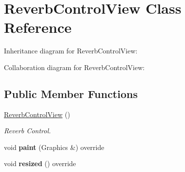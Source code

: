\hypertarget{class_reverb_control_view}{}\section{Reverb\+Control\+View Class Reference}
\label{class_reverb_control_view}


Inheritance diagram for Reverb\+Control\+View\+:


Collaboration diagram for Reverb\+Control\+View\+:
\subsection*{Public Member Functions}
\begin{DoxyCompactItemize}
\item 
\hyperlink{class_reverb_control_view_a86bde5a7a1cebf98bca7192bd19a269f}{Reverb\+Control\+View} ()\hypertarget{class_reverb_control_view_a86bde5a7a1cebf98bca7192bd19a269f}{}\label{class_reverb_control_view_a86bde5a7a1cebf98bca7192bd19a269f}

\begin{DoxyCompactList}\small\item\em Reverb Control. \end{DoxyCompactList}\item 
void {\bfseries paint} (Graphics \&) override\hypertarget{class_reverb_control_view_aebb5febe23a11a9690456820d7f9fc05}{}\label{class_reverb_control_view_aebb5febe23a11a9690456820d7f9fc05}

\item 
void {\bfseries resized} () override\hypertarget{class_reverb_control_view_a2958084f8b8711993670a0fd9ed7963b}{}\label{class_reverb_control_view_a2958084f8b8711993670a0fd9ed7963b}

\end{DoxyCompactItemize}
